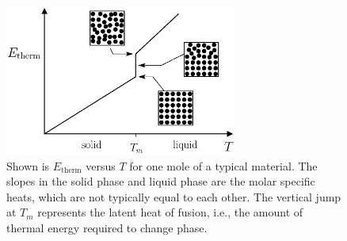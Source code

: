 \newpage


\begin{figure}
\begin{center}
\includegraphics[width=3in]{liquids_and_gases/etherm_vs_t.eps}
\caption{Shown is $E_\text{therm}$ versus $T$ for one mole of a
  typical material.  The slopes in the solid phase and liquid phase
  are the molar specific heats, which are not typically equal to each
  other.  The vertical jump at $T_m$ represents the latent heat of
  fusion, i.e., the amount of thermal energy required to change
  phase.}
\label{fig:etherm_vs_t}
\end{center}
\end{figure}

